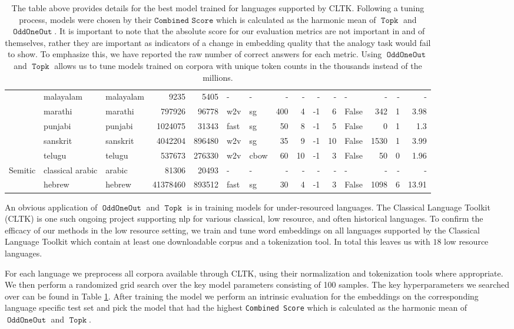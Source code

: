 \documentclass[11pt,a4paper]{article}
\DeclareMathOperator{\OddOneOut}{\texttt{OddOneOut}}
\DeclareMathOperator{\topk}{\texttt{Topk}}
\begin{document}
\begin{table}[t]
\begin{tabular}{l|llrr|llrrrrl|rrr}
    &malayalam & malayalam& \num{9235} & \num{5405} & - & - & - & - & - & - & - & - & - & - \\
    &marathi & marathi & \num{797926} & \num{96778} & w2v & sg & 400 & 4 & -1 & 6 & False & 342 & 1 & 3.98 \\
    &punjabi & punjabi & \num{1024075} & \num{31343} & fast & sg & 50 & 8 & -1 & 5 & False & 0 & 1 & 1.3 \\
    &sanskrit & sanskrit & \num{4042204} & \num{896480} & w2v & sg & 35 & 9 & -1 & 10 & False & 1530 & 1 & 3.99\\
    &telugu & telugu & \num{537673} & \num{276330} &  w2v & cbow & 60 & 10 & -1 & 3 & False & 50 & 0 & 1.96 \\
    \midrule
    \multirow{2}{*}{Semitic}&classical arabic & arabic& \num{81306} & \num{20493} & - & - & - & - & - & - & - & - & - & - \\
    &hebrew & hebrew & \num{41378460} & \num{893512} & fast & sg & 30 & 4 & -1 & 3 & False & 1098 & 6 & 13.91 \\  
\bottomrule
\end{tabular}
\caption{The table above provides details for the best model trained for languages supported by CLTK.
Following a tuning process, models were chosen by their $\texttt{Combined Score}$
which is calculated as the harmonic mean of $\topk$ and $\OddOneOut$.
It is important to note that the absolute score for our evaluation metrics are not important in and of themselves,
rather they are important as indicators of a change in embedding quality that the analogy task would fail to show.
To emphasize this, we have reported the raw number of correct answers for each metric.
Using $\OddOneOut$ and $\topk$ allows us to tune models trained on corpora with unique token counts in the thousands instead of the millions.}
\label{table:language}
\end{table}

An obvious application of $\OddOneOut$ and $\topk$ is in training models for under-resourced languages. 
The Classical Language Toolkit (CLTK) \cite{johnson2014} is one such ongoing project supporting nlp for various classical, low resource, and often historical languages.
To confirm the efficacy of our methods in the low resource setting, we train and tune word embeddings on all languages supported by the Classical Language Toolkit which contain at least one downloadable corpus and a tokenization tool. 
In total this leaves us with $18$ low resource languages.

For each language we preprocess all corpora available through CLTK, using their normalization and tokenization tools where appropriate. 
We then perform a randomized grid search over the key model parameters consisting of 100 samples. 
The key hyperparameters we searched over can be found in Table \ref{table:language}. 
After training the model we perform an intrinsic evaluation for the embeddings on the corresponding language specific test set 
and pick the model that had the highest \texttt{Combined Score} 
which is calculated as the harmonic mean of $\OddOneOut$ and $\topk$.
\end{document}
